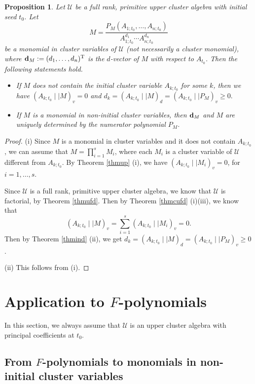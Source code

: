 \documentclass{amsart}
\newtheorem{proposition}[theorem]{Proposition}
\theoremstyle{definition}
\theoremstyle{remark}
\numberwithin{equation}{section}
\begin{document}
\begin{proposition}\label{prodvec}
 Let $\mathcal U$ be a full rank, primitive upper cluster algebra with initial seed $t_0$. Let
 $$M=\frac{P_M(A_{1;t_0},\ldots,A_{n;t_0})}{A_{1;t_0}^{d_1}\cdots A_{n;t_0}^{d_n}}$$ be a  monomial in cluster variables of $\mathcal U$ (not necessarily a cluster monomial),  where ${\bf d}_M:=(d_1,\ldots,d_n)^{\rm T}$ is the $d$-vector of $M$ with respect to $A_{t_0}$. Then the following statements hold.
 \begin{itemize}
 \item[(i)]  If $M$ does not contain the initial cluster variable $A_{k;t_0}$ for some $k$, then we have $(A_{k;t_0}\mid\mid M)_v=0$ and $d_k=(A_{k;t_0}\mid\mid M)_d=(A_{k;t_0}\mid\mid P_M)_v\geq 0.$

 \item[(ii)] If $M$ is a monomial in non-initial cluster variables, then ${\bf d}_M$ and $M$ are uniquely determined by the numerator polynomial $P_M$.
 \end{itemize}

\end{proposition}
 \begin{proof}
(i) Since $M$ is a monomial in cluster variables and it does not contain  $A_{k;t_0}$, we can assume that $M=\prod\limits_{i=1}^sM_i$, where each $M_i$ is a cluster variable of $\mathcal U$ different from $A_{k;t_0}$. By Theorem \ref{thmup} (i), we have $(A_{k;t_0}\mid\mid M_i)_v=0$, for $i=1,\ldots,s$.

Since $\mathcal U$ is a full rank, primitive upper cluster algebra, we know that $\mathcal U$ is factorial, by Theorem \ref{thmufd}. Then by Theorem \ref{thmcufd} (i)(iii),  we know that
$$(A_{k;t_0}\mid\mid M)_v=\sum\limits_{i=1}^s(A_{k;t_0}\mid\mid M_i)_v=0.$$
Then by Theorem \ref{thmind} (ii), we get $d_k=(A_{k;t_0}\mid\mid M)_d=(A_{k;t_0}\mid\mid P_M)_v\geq 0$.

(ii) This follows from (i).
 \end{proof}



\section{Application to \texorpdfstring{$F$}{Lg}-polynomials}\label{sec6}
In this section, we always assume that $\mathcal U$ is an upper cluster algebra with principal coefficients at $t_0$.
\subsection{From \texorpdfstring{$F$}{Lg}-polynomials to monomials in non-initial cluster variables}\label{sec61}
\end{document}
